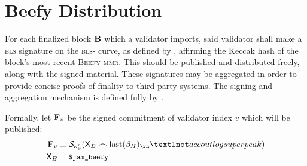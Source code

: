 \section{Beefy Distribution}\label{sec:beefy}

For each finalized block $\mathbf{B}$ which a validator imports, said validator shall make a \textsc{bls} signature on the \textsc{bls}- curve, as defined by \cite{bls12-381}, affirming the Keccak hash of the block's most recent \textsc{Beefy} \textsc{mmr}. This should be published and distributed freely, along with the signed material. These signatures may be aggregated in order to provide concise proofs of finality to third-party systems. The signing and aggregation mechanism is defined fully by \cite{cryptoeprint:2022/1611}.

Formally, let $\mathbf{F}_{v}$ be the signed commitment of validator index $v$ which will be published:
\begin{align}\label{eq:beefysignedcommitment}
  \mathbf{F}\sub{v} &\equiv \signdata_{\activeset'\sub{v}}(\mathsf{X}_B \concat \text{last}(\recenthistory)_\rh¬accoutlogsuperpeak)\\
  \mathsf{X}_B &= \token{\$jam\_beefy}
\end{align}
